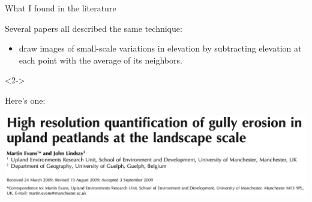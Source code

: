 \documentclass[aspectratio=169]{beamer}
\begin{document}
\begin{frame}{What I found in the literature}
\large
\vspace{0.5 cm}

Several papers all described the same technique:
\begin{itemize}
\item draw images of small-scale variations in elevation by subtracting elevation at each point with the average of its neighbors.
\end{itemize}

\vspace{0.5 cm}
\begin{uncoverenv}<2->
\begin{center}
\begin{minipage}{0.75\linewidth}
Here's one:
\vspace{0.5 cm}

\centering\includegraphics[width=\linewidth]{img/evans-lindsay-2010-gully-title.png}
\end{minipage}
\end{center}
\end{uncoverenv}
\end{frame}
\end{document}
